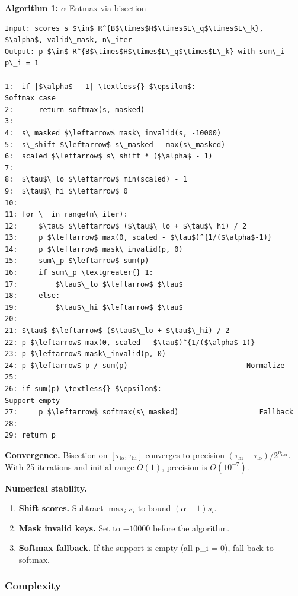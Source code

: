 \textbf{Algorithm 1:} $\alpha$-Entmax via bisection
\begin{lstlisting}
Input: scores s $\in$ R^{B$\times$H$\times$L\_q$\times$L\_k}, $\alpha$, valid\_mask, n\_iter
Output: p $\in$ R^{B$\times$H$\times$L\_q$\times$L\_k} with sum\_i p\_i = 1

1:  if |$\alpha$ - 1| \textless{} $\epsilon$:                          Softmax case
2:      return softmax(s, masked)
3:
4:  s\_masked $\leftarrow$ mask\_invalid(s, -10000)
5:  s\_shift $\leftarrow$ s\_masked - max(s\_masked)
6:  scaled $\leftarrow$ s\_shift * ($\alpha$ - 1)
7:
8:  $\tau$\_lo $\leftarrow$ min(scaled) - 1
9:  $\tau$\_hi $\leftarrow$ 0
10:
11: for \_ in range(n\_iter):
12:     $\tau$ $\leftarrow$ ($\tau$\_lo + $\tau$\_hi) / 2
13:     p $\leftarrow$ max(0, scaled - $\tau$)^{1/($\alpha$-1)}
14:     p $\leftarrow$ mask\_invalid(p, 0)
15:     sum\_p $\leftarrow$ sum(p)
16:     if sum\_p \textgreater{} 1:
17:         $\tau$\_lo $\leftarrow$ $\tau$
18:     else:
19:         $\tau$\_hi $\leftarrow$ $\tau$
20:
21: $\tau$ $\leftarrow$ ($\tau$\_lo + $\tau$\_hi) / 2
22: p $\leftarrow$ max(0, scaled - $\tau$)^{1/($\alpha$-1)}
23: p $\leftarrow$ mask\_invalid(p, 0)
24: p $\leftarrow$ p / sum(p)                            Normalize
25:
26: if sum(p) \textless{} $\epsilon$:                             Support empty
27:     p $\leftarrow$ softmax(s\_masked)                   Fallback
28:
29: return p
\end{lstlisting}

\textbf{Convergence.} Bisection on $[\tau_\text{lo}, \tau_\text{hi}]$ converges 
to precision $(\tau_\text{hi} - \tau_\text{lo}) / 2^{n_\text{iter}}$. With 
25 iterations and initial range $O(1)$, precision is $O(10^{-7})$.

\textbf{Numerical stability.}

\begin{enumerate}
\item \textbf{Shift scores.} Subtract $\max_i s_i$ to bound $(\alpha - 1) s_i$.
\item \textbf{Mask invalid keys.} Set to $-10000$ before the algorithm.
\item \textbf{Softmax fallback.} If the support is empty (all p\_i = 0), fall back
  to softmax.

\end{enumerate}
\subsubsection{Complexity}

